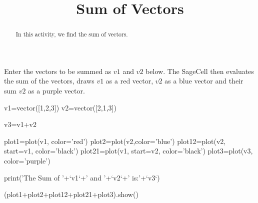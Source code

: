 \documentclass{ximera}
\title{Sum of Vectors}
\begin{document}
      
\begin{abstract}
      
In this activity, we find the sum of vectors.
      
\end{abstract}
      
\maketitle
      
Enter the vectors to be summed as $v1$ and $v2$ below.  The SageCell then evaluates the sum of the vectors, draws $v1$ as a red vector, $v2$ as a blue vector and  their sum $v2$ as a purple vector.

\begin{sageCell}
v1=vector([1,2,3])
v2=vector([2,1,3])

v3=v1+v2

plot1=plot(v1, color='red')
plot2=plot(v2,color='blue')
plot12=plot(v2, start=v1, color='black')
plot21=plot(v1, start=v2, color='black')
plot3=plot(v3, color='purple')

print('The Sum of '+`v1`+' and '+`v2`+' is:'+`v3`)

(plot1+plot2+plot12+plot21+plot3).show()
\end{sageCell}





 
 
 
 
      
\end{document}
